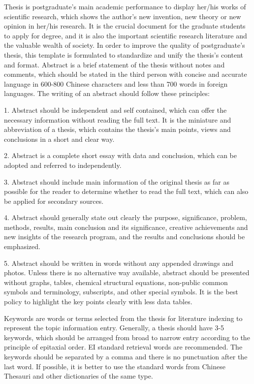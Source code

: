 \documentclass{cqupt_thesis}
\begin{document}
    \begin{enabstract}

        Thesis is postgraduate’s main academic performance to display her/his works of scientific research, which shows the author’s new invention, new theory or new opinion in her/his research. It is the crucial document for the graduate students to apply for degree, and it is also the important scientific research literature and the valuable wealth of society. In order to improve the quality of postgraduate’s thesis, this template is formulated to standardize and unify the thesis’s content and format.
        Abstract is a brief statement of the thesis without notes and comments, which should be stated in the third person with concise and accurate language in 600-800 Chinese characters and less than 700 words in foreign languages. The writing of an abstract should follow these principles:

        1. Abstract should be independent and self contained, which can offer the necessary information without reading the full text. It is the miniature and abbreviation of a thesis, which contains the thesis’s main points, views and conclusions in a short and clear way.

        2. Abstract is a complete short essay with data and conclusion, which can be adopted and referred to independently.

        3. Abstract should include main information of the original thesis as far as possible for the reader to determine whether to read the full text, which can also be applied for secondary sources.

        4. Abstract should generally state out clearly the purpose, significance, problem, methods, results, main conclusion and its significance, creative achievements and new insights of the research program, and the results and conclusions should be emphasized.

        5. Abstract should be written in words without any appended drawings and photos. Unless there is no alternative way available, abstract should be presented without graphs, tables, chemical structural equations, non-public common symbols and terminology, subscripts, and other special symbols. It is the best policy to highlight the key points clearly with less data tables.

        Keywords are words or terms selected from the thesis for literature indexing to represent the topic information entry. Generally, a thesis should have 3-5 keywords, which should be arranged from broad to narrow entry according to the principle of epitaxial order. EI standard retrieval words are recommended. The keywords should be separated by a comma and there is no punctuation after the last word. If possible, it is better to use the standard words from Chinese Thesauri and other dictionaries of the same type.


\end{enabstract}
\end{document}
